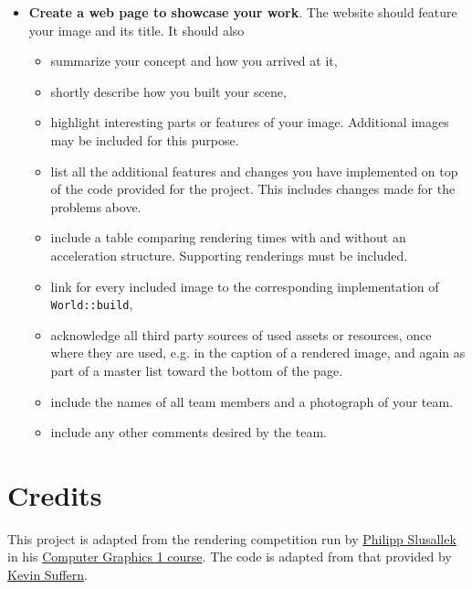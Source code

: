 \documentclass[addpoints]{exam}
\begin{document}
\begin{questions}
\begin{itemize}
  \item \textbf{Create a web page to showcase your work}. The website should feature your image and its title. It should also
    \begin{itemize}
    \item summarize your concept and how you arrived at it,
    \item shortly describe how you built your scene,
    \item highlight interesting parts or features of your image. Additional images may be included for this purpose.
    \item list all the additional features and changes you have implemented on top of the code provided for the project. This includes changes made for the problems above.
    \item include a table comparing rendering times with and without an acceleration structure. Supporting renderings must be included.
    \item link for every included image to the corresponding implementation of {\tt World::build},
    \item acknowledge all third party sources of used assets or resources, once where they are used, e.g. in the caption of a rendered image,  and again as part of a master list toward the bottom of the page.
    \item include the names of all team members and a photograph of your team.
    \item include any other comments desired by the team.
    \end{itemize}
  \end{itemize}

\end{questions}

\section*{Credits}

This project is adapted from the rendering competition run by \href{https://graphics.cg.uni-saarland.de/people/slusallek.html}{Philipp Slusallek} in his \href{https://graphics.cg.uni-saarland.de/courses/cg1-2018/}{Computer Graphics 1 course}. The code is adapted from that provided by \href{http://www.raytracegroundup.com/}{Kevin Suffern}.
\end{document}
